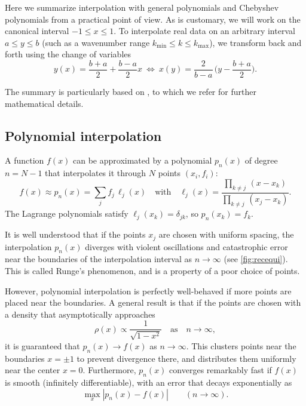 \documentclass{aa}
\newcommand\kmin{{k_\text{min}}}
\newcommand\kmax{{k_\text{max}}}
\begin{document}
Here we summarize interpolation with general polynomials and Chebyshev polynomials from a practical point of view.
As is customary, we will work on the canonical interval $-1 \leq x \leq 1$.
To interpolate real data on an arbitrary interval $a \leq y \leq b$ (such as a wavenumber range $\kmin \leq k \leq \kmax$),
we transform back and forth using the change of variables
\begin{equation}
	y(x) = \frac{b+a}{2} + \frac{b-a}{2} x
	\  \iff \ 
	x(y) = \frac{2}{b-a} \, \bigg( y - \frac{b+a}{2} \bigg).
\end{equation}

The summary is particularly based on \cite{trefethenApproximationTheoryApproximation2019,berrutBarycentricLagrangeInterpolation2004,trefethenSixMythsPolynomial}, to which we refer for further mathematical details.

\subsection{Polynomial interpolation}

A function $f(x)$ can be approximated by a polynomial $p_n(x)$ of degree $n=N-1$ that interpolates it through $N$ points $(x_i, f_i)$:
\begin{equation}
	f(x) \approx p_n(x) = \sum_j f_j \, \ell_j(x)
	\quad \text{with} \quad
	\ell_j(x) = \frac{\prod_{k \neq j} \, (x-x_k)}{\prod_{k \neq j} \, (x_j-x_k)} .
\label{eq:interppoly}
\end{equation}
The Lagrange polynomials satisfy $\ell_j(x_k) = \delta_{jk}$, so $p_n(x_k) = f_k$.

It is well understood that if the points $x_j$ are chosen with uniform spacing, the interpolation $p_n(x)$ diverges with violent oscillations and catastrophic error near the boundaries of the interpolation interval as $n \rightarrow \infty$ (see \cref{fig:recequi}).
This is called Runge's phenomenon, and is a property of a poor choice of points.

However, polynomial interpolation is perfectly well-behaved if more points are placed near the boundaries.
A general result is that if the points are chosen with a density that asymptotically approaches%
\begin{equation}
	\rho(x) \propto \frac{1}{\sqrt{1-x^2}}
	\quad \text{as} \quad
	n \rightarrow \infty,
\label{eq:density}
\end{equation}
it is guaranteed that $p_n(x) \rightarrow f(x)$ as $n \rightarrow \infty$.
This clusters points near the boundaries $x = \pm 1$ to prevent divergence there, and distributes them uniformly near the center $x = 0$.
Furthermore, $p_n(x)$ converges remarkably fast if $f(x)$ is smooth (infinitely differentiable), with an error that decays exponentially as%
\begin{equation}
	\max_x \left\lvert p_n(x) - f(x) \right\rvert
	\qquad
	(n \rightarrow \infty).
\label{eq:convergence}
\end{equation}
\end{document}
